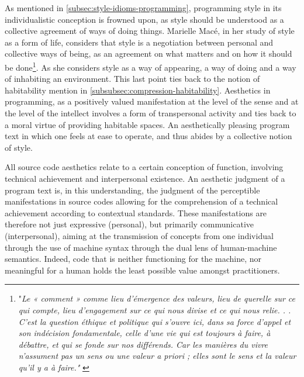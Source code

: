 As mentioned in \autoref{subsec:style-idioms-programming}, programming style in its individualistic conception is frowned upon, as style should be understood as a collective agreement of ways of doing things. Marielle Macé, in her study of style as a form of life, considers that style is a negotiation between personal and collective ways of being, as an agreement on what matters and on how it should be done\footnote{"\emph{Le « comment » comme lieu d'émergence des valeurs, lieu de querelle sur ce qui compte, lieu d'engagement sur ce qui nous divise et ce qui nous relie. . . C'est la question éthique et politique qui s'ouvre ici, dans sa force d'appel et son indécision fondamentale, celle d'une vie qui est toujours à faire, à débattre, et qui se fonde sur nos différends. Car les manières du vivre n'assument pas un sens ou une valeur a priori ; elles sont le sens et la valeur qu'il y a à faire."} \citep{mace_styles_2016}}. As she considers style as a way of appearing, a way of doing and a way of inhabiting an environment. This last point ties back to the notion of habitability mention in \autoref{subsubsec:compression-habitability}. Aesthetics in programming, as a positively valued manifestation at the level of the sense and at the level of the intellect involves a form of transpersonal activity and ties back to a moral virtue of providing habitable spaces. An aesthetically pleasing program text in which one feels at ease to operate, and thus abides by a collective notion of style.

\spacersmall

All source code aesthetics relate to a certain conception of function, involving technical achievement and interpersonal existence. An aesthetic judgment of a program text is, in this understanding, the judgment of the perceptible manifestations in source codes allowing for the comprehension of a technical achievement according to contextual standards. These manifestations are therefore not just expressive (personal), but primarily communicative (interpersonal), aiming at the transmission of concepts from one individual through the use of machine syntax through the dual lens of human-machine semantics. Indeed, code that is neither functioning for the machine, nor meaningful for a human holds the least possible value amongst practitioners.

